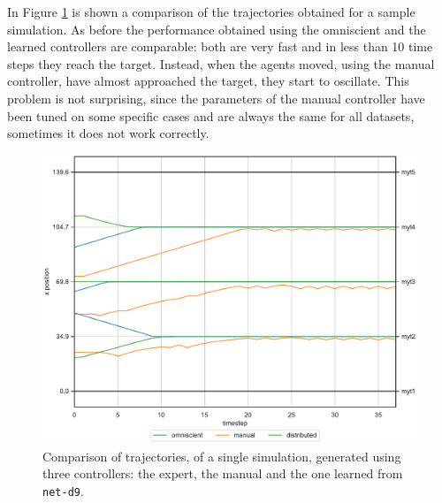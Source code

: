 In Figure \ref{fig:net-d9traj1} is shown a comparison of the trajectories obtained 
for a sample simulation.
As before the performance obtained using the omniscient and the learned 
controllers are comparable: both are very fast and in less than 10 time steps they 
reach the target. 
Instead, when the agents moved, using the manual controller, have almost 
approached the target, they start to oscillate. This problem is not surprising, since 
the parameters of the manual controller have been tuned on some specific cases 
and are always the same for all datasets, sometimes it does not work correctly.
\begin{figure}[!htb]
	\centering
	\includegraphics[width=.65\textwidth]{contents/images/net-d9/animation-distributed}%
	\caption[Evaluation of the trajectories obtained with \texttt{all\_sensor} 
	input.]{Comparison of trajectories, of a single simulation, generated using three 
		controllers: the expert, the manual and the one learned from \texttt{net-d9}.}
	\label{fig:net-d9traj1}
\end{figure}  

